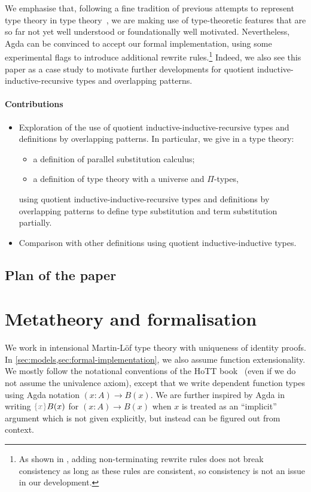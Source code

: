 \documentclass[a4paper,UKenglish,numberwithinsect,cleveref,thm-restate]{lipics-v2021}
\begin{document}
%
We emphasise that, following a fine tradition of previous attempts to represent type theory in type theory~\cite{Danielsson2006,Chapman2009,Altenkirch2016a}, we are making use of type-theoretic features that are so far not yet well understood or foundationally well motivated.
Nevertheless, Agda can be convinced to accept our formal implementation, using some experimental flags to introduce additional rewrite rules.\footnote{%
  As shown in \cite{Cockx2021}, adding non-terminating rewrite rules does not break consistency as long as these rules are consistent, so consistency is not an issue in our development.
}
Indeed, we also see this paper as a case study to motivate further developments for quotient inductive-inductive-recursive types and overlapping patterns.

\paragraph*{Contributions}
\begin{itemize}
  \item Exploration of the use of quotient inductive-inductive-recursive types and definitions by overlapping patterns.
    In particular, we give in a type theory:
    \begin{itemize}
      \item a definition of parallel substitution calculus;
      \item a definition of type theory with a universe and $\Pi$-types,
    \end{itemize}
   using quotient inductive-inductive-recursive types and definitions by overlapping patterns to define type substitution and term substitution partially.
  \item Comparison with other definitions using quotient inductive-inductive types.
\end{itemize}


\subsection{Plan of the paper}

\section{Metatheory and formalisation} \label{sec:meta}

We work in intensional Martin-L\"of type theory with uniqueness of identity proofs. In \cref{sec:models,sec:formal-implementation}, we also assume function extensionality.
%
We mostly follow the notational conventions of the HoTT book~\cite{UFP2013} (even if we do not assume the univalence axiom), except that we write dependent function types using Agda notation $(x : A) \to B(x)$.
%
We are further inspired by Agda in writing $\implicit{x}B(x)$ for $(x : A) \to B(x)$ when $x$ is treated as an ``implicit'' argument which is not given explicitly, but instead can be figured out from context.
\end{document}
